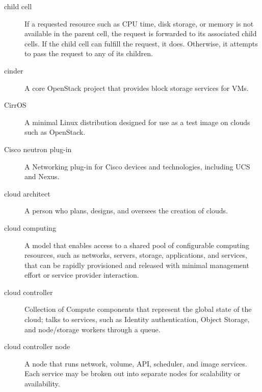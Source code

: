 \documentclass[letterpaper,10pt,english]{sphinxmanual}
\begin{document}
\begin{description}
\item[{child cell}] \leavevmode{}\label{_source/glossary:term-child-cell}
If a requested resource such as CPU time, disk storage, or
memory is not available in the parent cell, the request is forwarded
to its associated child cells. If the child cell can fulfill the
request, it does. Otherwise, it attempts to pass the request to any of
its children.

\item[{cinder}] \leavevmode{}\label{_source/glossary:term-cinder}
A core OpenStack project that provides block storage services
for VMs.

\item[{CirrOS}] \leavevmode{}\label{_source/glossary:term-cirros}
A minimal Linux distribution designed for use as a test
image on clouds such as OpenStack.

\item[{Cisco neutron plug-in}] \leavevmode{}\label{_source/glossary:term-cisco-neutron-plug-in}
A Networking plug-in for Cisco devices and technologies,
including UCS and Nexus.

\item[{cloud architect}] \leavevmode{}\label{_source/glossary:term-cloud-architect}
A person who plans, designs, and oversees the creation of
clouds.

\item[{cloud computing}] \leavevmode{}\label{_source/glossary:term-cloud-computing}
A model that enables access to a shared pool of configurable
computing resources, such as networks, servers, storage, applications,
and services, that can be rapidly provisioned and released with
minimal management effort or service provider interaction.

\item[{cloud controller}] \leavevmode{}\label{_source/glossary:term-cloud-controller}
Collection of Compute components that represent the global state
of the cloud; talks to services, such as Identity authentication,
Object Storage, and node/storage workers through a
queue.

\item[{cloud controller node}] \leavevmode{}\label{_source/glossary:term-cloud-controller-node}
A node that runs network, volume, API, scheduler, and image
services. Each service may be broken out into separate nodes for
scalability or availability.


\end{description}
\end{document}
